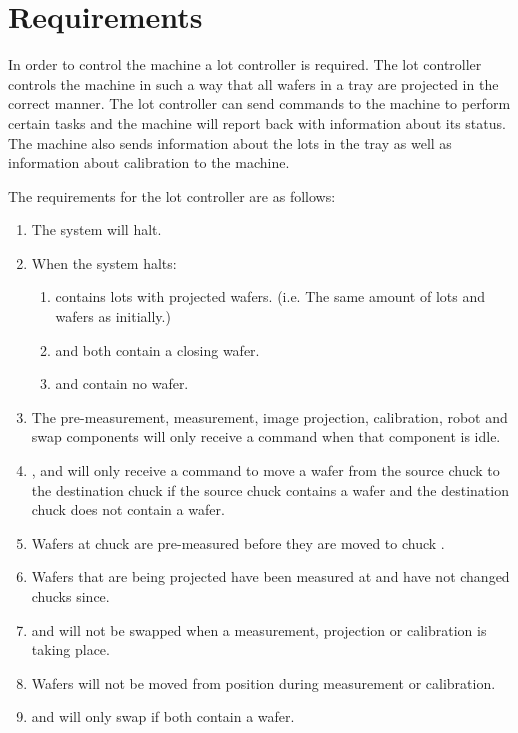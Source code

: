 \section{Requirements}
In order to control the machine a lot controller is required.
The lot controller controls the machine in such a way that all wafers in a tray are projected in the correct manner.
The lot controller can send commands to the machine to perform certain tasks and the machine will report back with information about its status.
The machine also sends information about the lots in the tray as well as information about calibration to the machine. 

The requirements for the lot controller are as follows:
\begin{enumerate}
    \item The system will halt.
    \item When the system halts:
        \begin{enumerate}
            \item \tray contains lots with projected wafers. (i.e. The same amount of lots and wafers as initially.)
            \item \chuckMeas and \chuckProj both contain a closing wafer.
            \item \chuckIn and \chuckOut contain no wafer.
        \end{enumerate}
    \item The pre-measurement, measurement, image projection, calibration, robot and swap components will only receive a command when that component is idle.
    \item \robotOne, \robotTwo and \robotThree will only receive a command to move a wafer from the source chuck to the destination chuck if the source chuck contains a wafer and the destination chuck does not contain a wafer.
    \item Wafers at chuck \chuckIn are pre-measured before they are moved to chuck \chuckMeas.
    \item Wafers that are being projected have been measured at \chuckMeas and have not changed chucks since.
    \item \chuckMeas and \chuckProj will not be swapped when a measurement, projection or calibration is taking place.
    \item Wafers will not be moved from \chuckMeas position during measurement or calibration.
    \item \chuckMeas and \chuckProj will only swap if both contain a wafer.

\end{enumerate}
